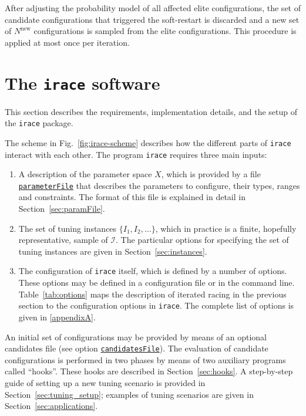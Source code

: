 \documentclass[a4paper]{article}
\newcommand{\irace}{\texttt{irace}\xspace}
\newcommand{\Nnew}{\ensuremath{N^\text{new}}\xspace}
\newcommand{\parameter}[1]{\hyperlink{opt:#1}{\texttt{#1}}}
\begin{document}
After adjusting the probability model of all affected elite
configurations, the set of candidate configurations that triggered the
soft-restart is discarded and a new set of $\Nnew$ configurations is
sampled from the elite configurations. This procedure is applied at
most once per iteration.


\section{The \irace software}\label{sec:setup}

This section describes the requirements, implementation details, and
the setup of the \irace package.


The scheme in Fig.~\ref{fig:irace-scheme} describes how the different
parts of \irace interact with each other. The program \irace requires
three main inputs:

\begin{enumerate}
\item A description of the parameter space $X$, which is provided by a
  file \parameter{parameterFile} that describes the parameters to
  configure, their types, ranges and constraints. The format of this
  file is explained in detail in Section~\ref{sec:paramFile}.

\item The set of tuning instances $\{I_1, I_2, \dotsc\}$, which in
  practice is a finite, hopefully representative, sample of
  $\mathcal{I}$. The particular options for specifying the set of
  tuning instances are given in Section~\ref{sec:instances}.

\item The configuration of \irace itself, which is defined by a number
  of options. These options may be defined in a configuration file or
  in the command line. Table~\ref{tab:options} maps the description of
  iterated racing in the previous section to the configuration options
  in \irace. The complete list of options is given in
  \autoref{appendixA}.
\end{enumerate}

An initial set of configurations may be provided by means of an
optional candidates file (see option \parameter{candidatesFile}). The
evaluation of candidate configurations is performed in two phases by
means of two auxiliary programs called ``hooks''. These hooks are
described in Section~\ref{sec:hooks}. A step-by-step guide of setting
up a new tuning scenario is provided in
Section~\ref{sec:tuning_setup}; examples of tuning scenarios are
given in Section~\ref{sec:applications}.
\end{document}
